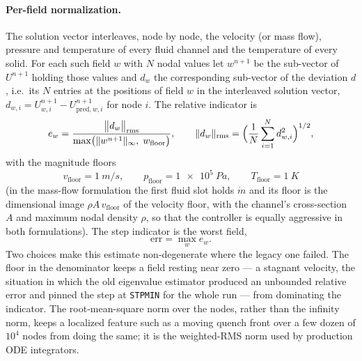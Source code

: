 \documentclass[11pt,a4paper]{article}
\newcommand{\code}[1]{\texttt{#1}}
\begin{document}
\paragraph{Per-field normalization.}
The solution vector interleaves, node by node, the velocity (or mass flow),
pressure and temperature of every fluid channel and the temperature of every
solid. For each such field $w$ with $N$ nodal values let $w^{n+1}$ be the
sub-vector of $U^{n+1}$ holding those values and $d_w$ the corresponding
sub-vector of the deviation $d$, i.e.\ its $N$ entries at the positions of
field $w$ in the interleaved solution vector,
$d_{w,i} = U^{n+1}_{w,i} - U^{n+1}_{\mathrm{pred},w,i}$ for node $i$. The
relative indicator is
\begin{equation}
  e_w = \frac{\bigl\|d_w\bigr\|_{\mathrm{rms}}}{\max\bigl(\|w^{n+1}\|_\infty,\; w_{\mathrm{floor}}\bigr)},
  \qquad
  \|d_w\|_{\mathrm{rms}} = \Bigl(\frac1N\sum_{i=1}^{N} d_{w,i}^{2}\Bigr)^{1/2},
  \label{eq:field-ratio}
\end{equation}
with the magnitude floors
\begin{equation}
  v_{\mathrm{floor}} = \SI{1}{m/s},\qquad
  p_{\mathrm{floor}} = \SI{1e5}{Pa},\qquad
  T_{\mathrm{floor}} = \SI{1}{K}
  \label{eq:floors}
\end{equation}
(in the mass-flow formulation the first fluid slot holds $\dot m$ and its floor
is the dimensional image $\rho A\,v_{\mathrm{floor}}$ of the velocity floor, with
the channel's cross-section $A$ and maximum nodal density $\rho$, so that the
controller is equally aggressive in both formulations). The step indicator is
the worst field,
\begin{equation}
  \mathrm{err} = \max_{w} e_w .
  \label{eq:worst-field}
\end{equation}
Two choices make this estimate non-degenerate where the legacy one failed. The
floor in the denominator keeps a field resting near zero --- a stagnant
velocity, the situation in which the old eigenvalue estimator produced an
unbounded relative error and pinned the step at \code{STPMIN} for the whole run
--- from dominating the indicator. The root-mean-square norm over the nodes,
rather than the infinity norm, keeps a localized feature such as a moving quench
front over a few dozen of $10^{4}$ nodes from doing the same; it is the
weighted-RMS norm used by production ODE integrators.
\end{document}
